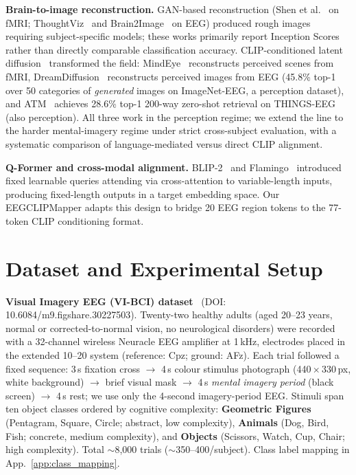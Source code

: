 \documentclass{article}
\begin{document}
\textbf{Brain-to-image reconstruction.} GAN-based reconstruction (Shen et al.~\citep{shen2019end} on fMRI; ThoughtViz~\citep{tirupattur2018thoughtviz} and Brain2Image~\citep{kavasidis2017brain2image} on EEG) produced rough images requiring subject-specific models; these works primarily report Inception Scores rather than directly comparable classification accuracy. CLIP-conditioned latent diffusion~\citep{rombach2022ldm,radford2021clip} transformed the field: MindEye~\citep{scotti2024mindeye} reconstructs perceived scenes from fMRI, DreamDiffusion~\citep{bai2023dreamdiffusion} reconstructs perceived images from EEG (45.8\% top-1 over 50 categories of \emph{generated} images on ImageNet-EEG, a perception dataset), and ATM~\citep{li2024atm} achieves 28.6\% top-1 200-way zero-shot retrieval on THINGS-EEG (also perception). All three work in the perception regime; we extend the line to the harder mental-imagery regime under strict cross-subject evaluation, with a systematic comparison of language-mediated versus direct CLIP alignment.

\textbf{Q-Former and cross-modal alignment.} BLIP-2~\citep{li2023blip2} and Flamingo~\citep{alayrac2022flamingo} introduced fixed learnable queries attending via cross-attention to variable-length inputs, producing fixed-length outputs in a target embedding space. Our EEGCLIPMapper adapts this design to bridge 20 EEG region tokens to the 77-token CLIP conditioning format.

\section{Dataset and Experimental Setup}
\label{sec:dataset}

\textbf{Visual Imagery EEG (VI-BCI) dataset}~\citep{figshare_eeg,figshare_paper} (DOI: 10.6084/m9.figshare.30227503). Twenty-two healthy adults (aged 20--23 years, normal or corrected-to-normal vision, no neurological disorders) were recorded with a 32-channel wireless Neuracle EEG amplifier at 1\,kHz, electrodes placed in the extended 10--20 system (reference: Cpz; ground: AFz). Each trial followed a fixed sequence: 3\,s fixation cross $\to$ 4\,s colour stimulus photograph (440\,{\small$\times$}\,330\,px, white background) $\to$ brief visual mask $\to$ 4\,s \emph{mental imagery period} (black screen) $\to$ 4\,s rest; we use only the 4-second imagery-period EEG. Stimuli span ten object classes ordered by cognitive complexity: \textbf{Geometric Figures} (Pentagram, Square, Circle; abstract, low complexity), \textbf{Animals} (Dog, Bird, Fish; concrete, medium complexity), and \textbf{Objects} (Scissors, Watch, Cup, Chair; high complexity). Total $\sim$8{,}000 trials ($\sim$350--400/subject). Class label mapping in App.~\ref{app:class_mapping}.
\end{document}

